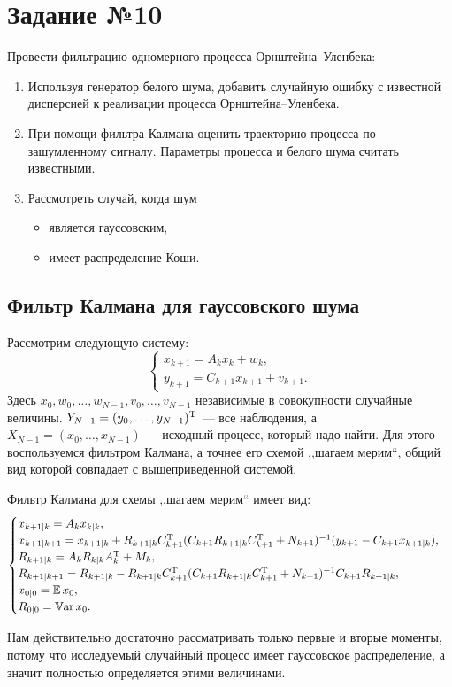 \section{Задание №10}

Провести фильтрацию одномерного процесса Орнштейна--Уленбека:
\begin{enumerate}
        \item Используя генератор белого шума, добавить случайную ошибку с известной дисперсией к реализации процесса Орнштейна--Уленбека.
        \item При помощи фильтра Калмана оценить траекторию процесса по зашумленному сигналу. Параметры процесса и белого шума считать известными.
        \item Рассмотреть случай, когда шум 
        \begin{itemize}
                \item является гауссовским,
                \item имеет распределение Коши.
        \end{itemize}
\end{enumerate}

\subsection{Фильтр Калмана для гауссовского шума}

Рассмотрим следующую систему:
$$
        \begin{cases}
x_{k+1} = A_k x_k + w_k, \\
y_{k+1} = C_{k+1}x_{k+1} + v_{k+1}.
        \end{cases}
$$
Здесь $x_0, w_0, \ldots, w_{N-1}, v_0,\ldots,v_{N-1}$ независимые в совокупности случайные величины. $Y_{N-1} = (y_0,\ldots,y_{N-1})^{\mathrm{T}}$ --- все наблюдения, а $X_{N-1} = (x_0,\ldots,x_{N-1})$ --- исходный процесс, который надо найти. Для этого воспользуемся фильтром Калмана, а точнее его схемой ,,шагаем мерим``, общий вид которой совпадает с вышеприведенной системой.

Фильтр Калмана для схемы ,,шагаем мерим`` имеет вид:
$$
        \begin{cases}
x_{k+1|k} = A_k x_{k|k},
        \\
x_{k+1|k+1}
=
x_{k+1|k}
+
R_{k+1|k}
C_{k+1}^{\mathrm{T}}
(
        C_{k+1}
        R_{k+1|k}
        C_{k+1}^{\mathrm{T}}
        +
        N_{k+1}
)^{-1}
(
        y_{k+1}
        -
        C_{k+1}
        x_{k+1|k}
),
        \\
R_{k+1|k}
=
A_k
R_{k|k}
A_k^{\mathrm{T}}
+M_k,
        \\
R_{k+1|k+1}
=
R_{k+1|k}
-
R_{k+1|k}
C_{k+1}^{\mathrm{T}}
(
        C_{k+1}
        R_{k+1|k}
        C_{k+1}^{\mathrm{T}}
        +
        N_{k+1}
)^{-1}
C_{k+1}
R_{k+1|k},
        \\
x_{0|0} = \mathbb{E}\,x_0,
        \\
R_{0|0} = \mathbb{V}\mbox{ar}\,x_0.
        \end{cases}
$$
\begin{remark}
        Нам действительно достаточно рассматривать только первые и вторые моменты, потому что исследуемый случайный процесс имеет гауссовское распределение, а значит полностью определяется этими величинами.
\end{remark}

